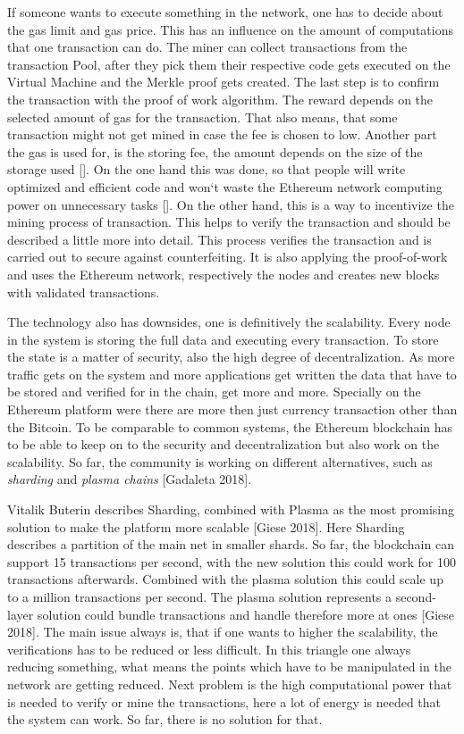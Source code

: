 If someone wants to execute something in the network, one has to decide about the gas limit and gas price. 
This has an influence on the amount of computations that one transaction can do.
The miner can collect transactions from the transaction Pool, after they pick them their respective code gets executed on the Virtual Machine and the Merkle proof gets created. 
The last step is to confirm the transaction with the proof of work algorithm. 
The reward depends on the selected amount of gas for the transaction. 
That also means, that some transaction might not get mined in case the fee is chosen to low. Another part the gas is used for, is the storing fee, the amount depends on the size of the storage used [].
On the one hand this was done, so that people will write optimized and efficient code and won`t waste the Ethereum network computing power on unnecessary tasks [].
On the other hand, this is a way to incentivize the mining process of transaction. 
This helps to verify the transaction and should be described a little more into detail. 
This process verifies the transaction and is carried out to secure against counterfeiting. 
It is also applying the proof-of-work and uses the Ethereum network, respectively the nodes and creates new blocks with validated transactions. 

The technology also has downsides, one is definitively the scalability. 
Every node in the system is storing the full data and executing every transaction. 
To store the state is a matter of security, also the high degree of decentralization. 
As more traffic gets on the system and more applications get written the data that have to be stored and verified for in the chain, get more and more. 
Specially on the Ethereum platform were there are more then just currency transaction other than the Bitcoin. 
To be comparable to common systems, the Ethereum blockchain has to be able to keep on to the security and decentralization but also work on the scalability. 
So far, the community is working on different alternatives, such as \emph{sharding} and \emph{plasma chains} [Gadaleta 2018].

Vitalik Buterin describes Sharding, combined with Plasma as the most promising solution to make the platform more scalable [Giese 2018].
Here Sharding describes a partition of the main net in smaller shards. 
So far, the blockchain can support 15 transactions per second, with the new solution this could work for 100 transactions afterwards. 
Combined with the plasma solution this could scale up to a million transactions per second. 
The plasma solution represents a second-layer solution could bundle transactions and handle therefore more at ones [Giese 2018].
The main issue always is, that if one wants to higher the scalability, the verifications has to be reduced or less difficult. 
In this triangle one always reducing something, what means the points which have to be manipulated in the network are getting reduced.
Next problem is the high computational power that is needed to verify or mine the transactions, here a lot of energy is needed that the system can work. So far, there is no solution for that.

